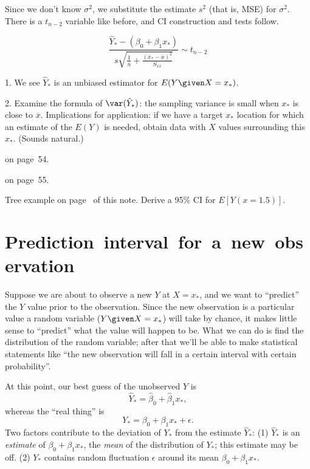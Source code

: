 \documentclass[12pt]{article}
\begin{document}
Since we don't know $\sigma^2$, we substitute the estimate $s^2$
(that is, MSE) for $\sigma^2$.
There is a $t_{n-2}$ variable like before,
and CI construction and tests follow.

\alert[Theorem]%
\[
\frac{\hat{Y}_* - (\beta_0 + \beta_1 x_*)}
    {s\sqrt{\frac{1}{n} + \frac{(x_* - \overline{x})^2}{S_{xx}}}}
\sim t_{n-2}
\]

\alert
1. We see $\hat{Y}_*$ is an unbiased estimator for $E(Y \given X = x_*)$.

2. Examine the formula of $\var(\hat{Y}_*)$:
the sampling variance is small when $x_*$ is close to $\overline{x}$.
Implications for application:
if we have a target $x_*$ location for which an estimate of the $E(Y)$
is needed, obtain data with $X$ values surrounding this $x_*$.
(Sounds natural.)

 on page~54.

 on page~55.

\example Tree example on page~\pageref{ex:tree} of this note.
Derive a 95\% CI for $E[Y(x = 1.5)]$.

\section{\mbox{Prediction interval for a new observation}}

Suppose we are about to observe a new $Y$ at $X = x_*$,
and we want to ``predict'' the $Y$ value prior to the observation.
Since the new observation is a particular value a random variable
($Y \given X = x_*$) will take by chance, it makes little sense to
``predict'' what the value will happen to be.
What we can do is find the distribution of the random variable;
after that we'll be able to make statistical statements like
``the new observation will fall in a certain interval with certain
probability''.

At this point, our best guess of the unobserved $Y$ is
\[
\hat{Y}_* = \hat{\beta}_0 + \hat{\beta}_1 x_*
,
\]
whereas the ``real thing'' is
\[
Y_* = \beta_0 + \beta_1 x_* + \epsilon
.
\]
Two factors contribute to the deviation of $Y_*$ from
the estimate $\hat{Y}_*$:
(1) $\hat{Y}_*$ is an \emph{estimate} of
$\beta_0 + \beta_1 x_*$, the \emph{mean} of the distribution of $Y_*$;
this estimate may be off.
(2) $Y_*$ contains random fluctuation $\epsilon$ around its mean
$\beta_0 + \beta_1 x_*$.
\end{document}
